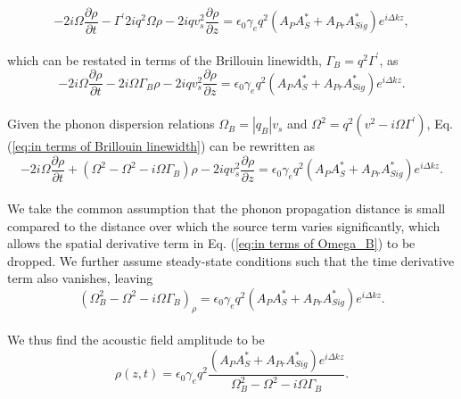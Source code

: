 \documentclass[%
  reprint,
  superscriptaddress,
  amsmath,amssymb,
  aps,
  prapplied,
]{revtex4-2}
\begin{document}
\\
\begin{equation}
    -2i\Omega\frac{\partial\rho}{\partial t} - \Gamma^{\prime}2iq^{2}\Omega\rho - 2iqv_{s}^{2}\frac{\partial\rho}{\partial z} = \epsilon_{0}\gamma_{e}q^{2}(A_{P}A_{S}^{*} + A_{Pr}A_{Sig}^{*})e^{i\Delta kz},
\end{equation}
\\
which can be restated in terms of the Brillouin linewidth, $\Gamma_{B} = q^{2}\Gamma^{\prime}$, as
\\
\begin{equation}
    -2i\Omega\frac{\partial\rho}{\partial t} - 2i\Omega\Gamma_{B}\rho - 2iqv_{s}^{2}\frac{\partial\rho}{\partial z} = \epsilon_{0}\gamma_{e}q^{2}(A_{P}A_{S}^{*} + A_{Pr}A_{Sig}^{*})e^{i\Delta kz}.
    \label{eq:in terms of Brillouin linewidth}
\end{equation}
\\
Given the phonon dispersion relations $\Omega_{B} = |q_{B}|v_{s}$ and $\Omega^{2} = q^{2}\left(v^{2} - i\Omega\Gamma^{\prime}\right)$, Eq. (\ref{eq:in terms of Brillouin linewidth}) can be rewritten as
\\
\begin{equation}
    -2i\Omega\frac{\partial\rho}{\partial t} + \left(\Omega^{2} - \Omega^{2} - i\Omega\Gamma_{B}\right)\rho - 2iqv_{s}^{2}\frac{\partial\rho}{\partial z} = \epsilon_{0}\gamma_{e}q^{2}(A_{P}A_{S}^{*} + A_{Pr}A_{Sig}^{*})e^{i\Delta kz}.
    \label{eq:in terms of Omega_B}
\end{equation}
\\
We take the common assumption that the phonon propagation distance is small compared to the distance over which the source term varies significantly, which allows the spatial derivative term in Eq. (\ref{eq:in terms of Omega_B}) to be dropped. We further assume steady-state conditions such that the time derivative term also vanishes, leaving
\\
\begin{equation}
    (\Omega^{2}_{B} - \Omega^{2} - i\Omega\Gamma_{B})_{\rho} = \epsilon_{0}\gamma_{e}q^{2}(A_{P}A_{S}^{*} + A_{Pr}A_{Sig}^{*})e^{i\Delta kz}.
\end{equation}
\\
We thus find the acoustic field amplitude to be
\\
\begin{equation}
    \rho(z,t) = \epsilon_{0}\gamma_{e}q^{2}\frac{(A_{P}A_{S}^{*} + A_{Pr}A_{Sig}^{*})e^{i\Delta kz}}{\Omega_{B}^{2} - \Omega^{2} - i\Omega\Gamma_{B}}.
    \label{eq:Acoustic field amplitude}
\end{equation}
\end{document}
